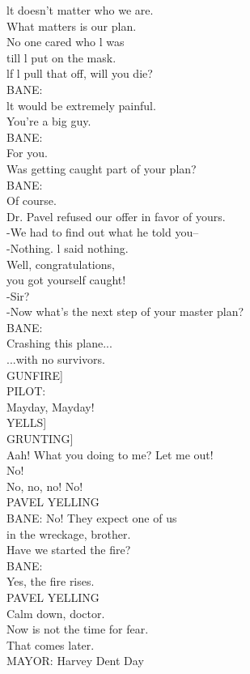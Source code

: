 \documentclass{article}
\begin{document}
\begin{multicols}{3}
lt doesn't matter who we are.\\
What matters is our plan.\\
No one cared who l was\\
till l put on the mask.\\
lf l pull that off, will you die?\\
BANE:\\
lt would be extremely painful.\\
You're a big guy.\\
BANE:\\
For you.\\
Was getting caught part of your plan?\\
BANE:\\
Of course.\\
Dr. Pavel refused our offer in favor of yours.\\
-We had to find out what he told you--\\
-Nothing. l said nothing.\\
Well, congratulations,\\
you got yourself caught!\\
-Sir?\\
-Now what's the next step of your master plan?\\
BANE:\\
Crashing this plane...\\
...with no survivors.\\
GUNFIRE]\\
PILOT:\\
Mayday, Mayday!\\
YELLS]\\
GRUNTING]\\
Aah! What you doing to me? Let me out!\\
No!\\
No, no, no! No!\\
PAVEL YELLING\\
BANE: No! They expect one of us\\
in the wreckage, brother.\\
Have we started the fire?\\
BANE:\\
Yes, the fire rises.\\
PAVEL YELLING\\
Calm down, doctor.\\
Now is not the time for fear.\\
That comes later.\\
MAYOR: Harvey Dent Day\\

\end{multicols}
\end{document}
